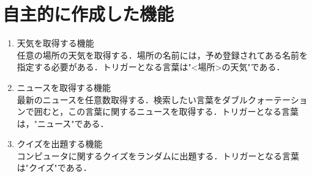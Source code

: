 \documentclass[12pt]{jsarticle}
\begin{document}
\section{自主的に作成した機能}
\begin{enumerate}
\item 天気を取得する機能\\
任意の場所の天気を取得する．場所の名前には，予め登録されてある名前を指定する必要がある．トリガーとなる言葉は"<場所>の天気"である．
\item ニュースを取得する機能\\
最新のニュースを任意数取得する．検索したい言葉をダブルクォーテーションで囲むと，この言葉に関するニュースを取得する．トリガーとなる言葉は，"ニュース"である．
\item クイズを出題する機能\\
コンピュータに関するクイズをランダムに出題する．トリガーとなる言葉は"クイズ"である．
\end{enumerate}



\end{document}
